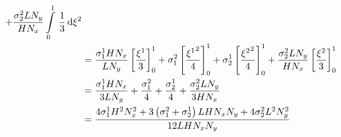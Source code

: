 \begin{equation}
\begin{aligned}
    +\dfrac{\conductivitytensorsymbol^{2}_{2} L N_{y}}{H N_{x}}\gint{0}{1}{\dfrac{1}{3}}{\xitwo} \\
    &=\dfrac{\conductivitytensorsymbol^{1}_{1} H N_{x}}{L N_{y}}\sqbrac{\dfrac{\xione}{3}}^{1}_{0}
    +\conductivitytensorsymbol^{2}_{1}\sqbrac{\dfrac{\xionesq}{4}}^{1}_{0}
    +\conductivitytensorsymbol^{1}_{2}\sqbrac{\dfrac{\xitwosq}{4}}^{1}_{0}
    +\dfrac{\conductivitytensorsymbol^{2}_{2} L N_{y}}{H N_{x}}\sqbrac{\dfrac{\xitwo}{3}}^{1}_{0} \\
    &=\dfrac{\conductivitytensorsymbol^{1}_{1} H N_{x}}{3 L N_{y}}+\dfrac{\conductivitytensorsymbol^{2}_{1}}{4}+
    \dfrac{\conductivitytensorsymbol^{1}_{2}}{4}+\dfrac{\conductivitytensorsymbol^{2}_{2} L N_{y}}{3 H N_{x}} \\
    &=\dfrac{4\conductivitytensorsymbol^{1}_{1}H^{2}N_{x}^{2}+3\pbrac{\conductivitytensorsymbol^{2}_{1}+
        \conductivitytensorsymbol^{1}_{2}}L H N_{x} N_{y}+4\conductivitytensorsymbol^{2}_{2}L^{2}N_{y}^{2}}{12 L H N_{x} N_{y}}
  \end{aligned}
\end{equation}


